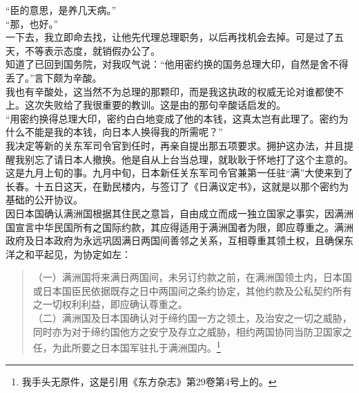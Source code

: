 “臣的意思，是养几天病。”\\

“那，也好。”\\

一下去，我立即命去找，让他先代理总理职务，以后再找机会去掉。可是过了五天，不等表示态度，就销假办公了。\\

知道了已回到国务院，对我叹气说：“他用密约换的国务总理大印，自然是舍不得丢了。”言下颇为辛酸。\\

我也有辛酸处，这当然不为总理的那颗印，而是我这执政的权威无论对谁都使不上。这次失败给了我很重要的教训。这是由的那句辛酸话启发的。\\

“用密约换得总理大印，密约白白地变成了他的本钱，这真太岂有此理了。密约为什么不能是我的本钱，向日本人换得我的所需呢？”\\

我决定等新的关东军司令官到任时，再亲自提出那五项要求。拥护这办法，并且提醒我别忘了请日本人撤换。他是自从上台当总理，就耿耿于怀地打了这个主意的。\\

这是九月上旬的事。九月中旬，日本新任关东军司令官兼第一任驻“满”大使来到了长春。十五日这天，在勤民楼内，与签订了《日满议定书》，这就是以那个密约为基础的公开协议。\\

因日本国确认满洲国根据其住民之意旨，自由成立而成一独立国家之事实，因满洲国宣言中华民国所有之国际约款，其应得适用于满洲国者为限，即应尊重之。满洲政府及日本政府为永远巩固满日两国间善邻之关系，互相尊重其领土权，且确保东洋之和平起见，为协定如左：\\

\begin{quote}
	（一）满洲国将来满日两国间，未另订约款之前，在满洲国领土内，日本国或日本国臣民依据既存之日中两国间之条约协定，其他约款及公私契约所有之一切权利利益，即应确认尊重之。\\

（二）满洲国及日本国确认对于缔约国一方之领土，及治安之一切之威胁，同时亦为对于缔约国他方之安宁及存立之威胁，相约两国协同当防卫国家之任，为此所要之日本国军驻扎于满洲国内。\footnote{我手头无原件，这是引用《东方杂志》第29卷第4号上的。}\\
\end{quote}

